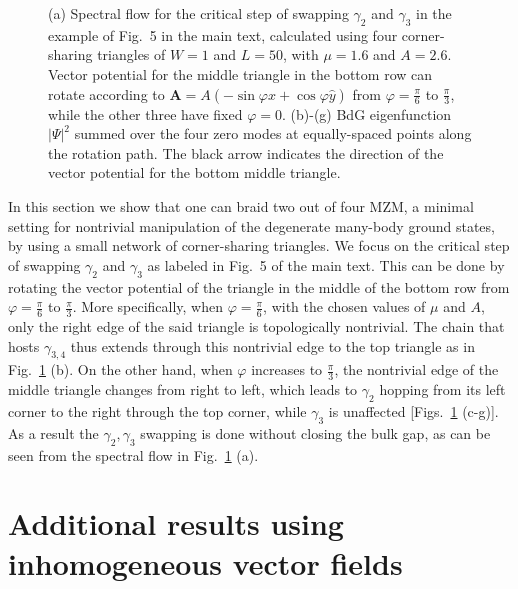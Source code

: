 \begin{figure}[!ht]
  \caption{(a) Spectral flow for the critical step of swapping $\gamma_2$ and $\gamma_3$ in the example of Fig.~5 in the main text, calculated using four corner-sharing triangles of $W=1$ and $L=50$, with $\mu=1.6$ and $A=2.6$. Vector potential for the middle triangle in the bottom row can rotate according to $\mathbf A = A(-\sin\varphi \hat{x} + \cos\varphi \hat{y})$ from $\varphi = \frac{\pi}{6}$ to $\frac{\pi}{3}$, while the other three have fixed $\varphi = 0$. (b)-(g) BdG eigenfunction $|\Psi|^2$ summed over the four zero modes at equally-spaced points along the rotation path. The black arrow indicates the direction of the vector potential for the bottom middle triangle.}\label{fig: supp braiding}
\end{figure}

In this section we show that one can braid two out of four MZM, a minimal setting for nontrivial manipulation of the degenerate many-body ground states, by using a small network of corner-sharing triangles. We focus on the critical step of swapping $\gamma_2$ and $\gamma_3$ as labeled in Fig.~5 of the main text. This can be done by rotating the vector potential of the triangle in the middle of the bottom row from $\varphi = \frac{\pi}{6}$ to $\frac{\pi}{3}$. More specifically, when $\varphi = \frac{\pi}{6}$, with the chosen values of $\mu$ and $A$, only the right edge of the said triangle is topologically nontrivial. The chain that hosts $\gamma_{3,4}$ thus extends through this nontrivial edge to the top triangle as in Fig.~\ref{fig: supp braiding} (b). On the other hand, when $\varphi$ increases to $\frac{\pi}{3}$, the nontrivial edge of the middle triangle changes from right to left, which leads to $\gamma_2$ hopping from its left corner to the right through the top corner, while $\gamma_3$ is unaffected [Figs.~\ref{fig: supp braiding} (c-g)]. As a result the $\gamma_2,\gamma_3$ swapping is done without closing the bulk gap, as can be seen from the spectral flow in Fig.~\ref{fig: supp braiding} (a).


\section{Additional results using inhomogeneous vector fields}

